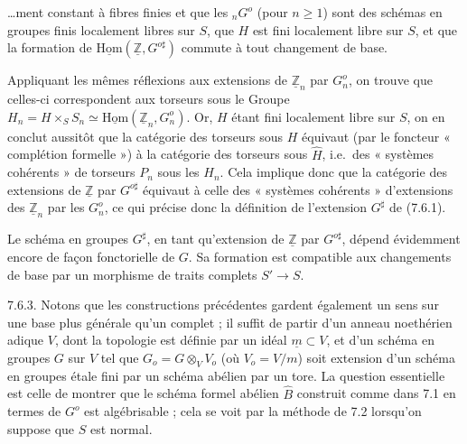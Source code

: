 \documentclass[11pt,a4paper]{article}
\begin{document}

\ldots ment constant à fibres finies et que les $_{n}G^{o}$ (pour $n \geqslant
1$) sont des schémas en groupes \struck{\ill{}} finis localement libres sur
$S$, que $H$ est fini localement libre sur $S$, et que la formation
\struck{\ill{}} de $\underline{\mathrm{Hom}}(\underline{\mathbb{Z}},
G^{o\sharp})$ commute à tout changement de base.

Appliquant les mêmes réflexions aux extensions de $\underline{\mathbb{Z}}_{n}$
par $G^{o}_{n}$, on trouve que celles-ci correspondent aux torseurs sous le
Groupe $H_{n} = H \times_{S} S_{n} \simeq
\underline{\mathrm{Hom}}(\underline{\mathbb{Z}}_{n}, G^{o}_{n})$. Or, $H$ étant
fini localement libre sur $S$, on en conclut aussitôt que la
\struck{\ill{}} catégorie des torseurs sous $H$ équivaut (par le foncteur
« complétion formelle ») à la catégorie des torseurs sous $\hat{H}$, i.e.\ des
« systèmes cohérents » de torseurs $P_{n}$ sous les $H_{n}$. Cela implique donc
que la catégorie des extensions de $\underline{\mathbb{Z}}$ par $G^{o\sharp}$
équivaut à celle des  « systèmes cohérents » d'extensions
des $\underline{\mathbb{Z}}_{n}$ par les $G^{o}_{n}$, ce qui précise donc la
définition de l'extension $G^{\sharp}$ de (7.6.1).

Le schéma en groupes $G^{\sharp}$, en tant qu'extension de
$\underline{\mathbb{Z}}$ par $G^{o\sharp}$, dépend évidemment encore de façon
fonctorielle de $G$. Sa formation est compatible aux changements de base par un
morphisme de traits complets $S' \to S$.

7.6.3. Notons que les constructions précédentes gardent également un sens sur
une base plus générale qu'un \struck{\ill{}}  complet ; il
suffit de partir d'un anneau noethérien adique $V$, dont la topologie est
définie par un \struck{\ill{}} idéal $\underline{m} \subset V$, et d'un schéma
en groupes $G$ sur $V$ tel que $G_{o} = G \otimes_{V} V_{o}$ (où $V_{o} = V/m$)
soit extension d'un schéma en groupes étale fini par un \struck{\ill{}} schéma
abélien par un tore. La question essentielle est celle de montrer que le schéma
formel abélien $\hat{B}$  construit comme dans 7.1 en termes de
$G^{o}$ est algébrisable ; cela se voit par la méthode de 7.2 lorsqu'on suppose
que $S$ est normal.
\end{document}

